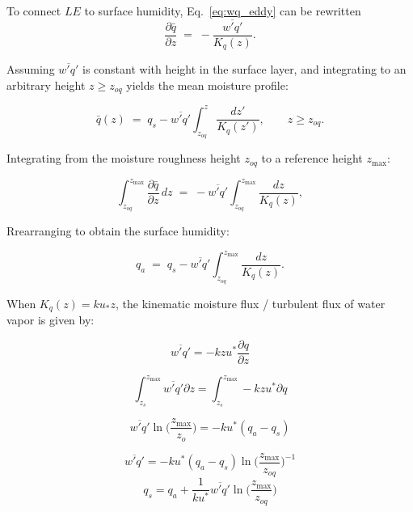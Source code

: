 \documentclass{article}
\begin{document}
    To connect $LE$ to surface humidity, 
    Eq.~\eqref{eq:wq_eddy} can be rewritten
    \begin{equation}
    \frac{\partial \bar q}{\partial z}
    \;=\;
    -\frac{\overline{w'q'}}{K_q(z)}.
    \end{equation}
    
    Assuming $\overline{w'q'}$ is constant with height in the surface layer, and integrating to an arbitrary height $z\ge z_{oq}$ yields the mean moisture profile:
    
    \begin{equation}
    \bar q(z)
    \;=\;
    q_s
    -\overline{w'q'}\int_{z_{oq}}^{z}\frac{dz'}{K_q(z')},
    \qquad z\ge z_{oq}.
    \label{eq:q_profile_general}
    \end{equation}
    
    Integrating from the moisture roughness height $z_{oq}$ to a reference height $z_{\max}$:
    
    \begin{equation}
    \int_{z_{oq}}^{z_{\max}}\frac{\partial \bar q}{\partial z}\,dz
    \;=\;
    -\overline{w'q'}\int_{z_{oq}}^{z_{\max}}\frac{dz}{K_q(z)},
    \end{equation}
    
      Rrearranging to obtain the surface humidity: 
      
    \begin{equation}
    q_a \;=\;  q_s
    -\overline{w'q'}\int_{z_{oq}}^{z_{\max}}\frac{dz}{K_q(z)}.
    \label{eq:qa_minus_qs_general}
    \end{equation}
    
    When $K_q(z)=ku_*z$, the kinematic moisture flux / turbulent flux of water vapor is given by:
    
     \begin{equation}
         \overline{w'q'} = -kzu^* \frac{\partial q}{\partial z}
     \end{equation}
    
    \begin{equation}
         \int_{z_{s}}^{z_{\max}}\overline{w'q'} \partial z = 
         \int_{z_{s}}^{z_{\max}} -kzu^* \partial q
     \end{equation}
    
    \begin{equation}
         \overline{w'q'} \ln  \bigg(\frac{z_{\max}}{z_o}\bigg) = 
         -k u^* (q_a - q_s)
     \end{equation}
     
    \begin{equation}
         \overline{w'q'}  = 
         -k u^* (q_a - q_s)  \ln  \bigg(\frac{z_{\max}}{z_{oq}}\bigg)^{-1}
     \end{equation}  
    \begin{equation}
        q_s = q_a + \frac{1}{ ku^* } \overline{w'q'} \ln  \bigg(\frac{z_{\max}}{z_{oq}}\bigg) 
     \end{equation}
    
\end{document}
